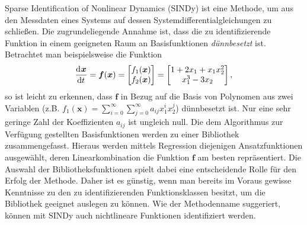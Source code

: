 
Sparse Identification of Nonlinear Dynamics (SINDy) ist eine Methode, um aus den Messdaten eines Systems auf dessen Systemdifferentialgleichungen zu schließen. Die zugrundeliegende Annahme ist, dass die zu identifizierende Funktion in einem geeigneten Raum an Basisfunktionen \textit{dünnbesetzt} ist. Betrachtet man beispielsweise die Funktion
\begin{equation}
\frac{\mathrm{d}^{}\boldsymbol{x}}{\mathrm{d}{t}^{}} = \boldsymbol{f}(\boldsymbol{x}) = \begin{bmatrix} f_1(\boldsymbol{x})\\ f_2(\boldsymbol{x})\\ \end{bmatrix}
=\begin{bmatrix} 1+2x_1+x_1x_2^2 \\ x_1^3-3x_2\\ \end{bmatrix},
\end{equation}
so ist leicht zu erkennen, dass $\boldsymbol{f}$ in Bezug auf die Basis von Polynomen aus zwei Variablen (z.B. $f_1(\boldsymbol{x})=\sum_{i=0}^{\infty}\sum_{j=0}^{\infty}a_{ij}x_1^ix_2^j$) dünnbesetzt ist. Nur eine sehr geringe Zahl der Koeffizienten $a_{ij}$ ist ungleich null. 
Die dem Algorithmus zur Verfügung gestellten Basisfunktionen werden zu einer Bibliothek zusammengefasst. Hieraus werden mittels Regression diejenigen Ansatzfunktionen ausgewählt, deren Linearkombination die Funktion $\boldsymbol{f}$ am besten repräsentiert. Die Auswahl der Bibliotheksfunktionen spielt dabei eine entscheidende Rolle für den Erfolg der Methode. Daher ist es günstig, wenn man bereits im Voraus gewisse Kenntnisse zu den zu identifizierenden Funktionsklassen besitzt, um die Bibliothek geeignet auslegen zu können. Wie der Methodenname suggeriert, können mit SINDy auch nichtlineare Funktionen identifiziert werden. 